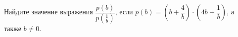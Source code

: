 \begin{ex}
	\begin{condition}
		Найдите значение выражения \( \dfrac{p(b)}{p\left( \frac{1}{b} \right)} \), если \( p(b)=\left( b+\dfrac{4}{b} \right)\cdot\left( 4b+\dfrac{1}{b} \right) \), а также \( b\neq0 \).
	\end{condition}
\end{ex}